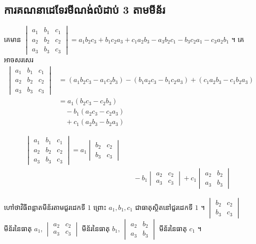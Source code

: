 \subsection{ការគណនាដេទែរមីណង់លំដាប់ 3 តាមមីន័រ}

គេមាន $\begin{vmatrix} a_1 & b_1 & c_1\\ a_2 & b_2 & c_2\\ a_3 & b_3 & c_3 \end{vmatrix} = a_1b_2c_3 + b_1c_2a_3 + c_1a_2b_3 - a_3b_2c_1 - b_3c_2a_1 - c_3a_2b_1$ ។ គេអាចសរសេរ
\[
\begin{aligned}
\begin{vmatrix} a_1 & b_1 & c_1\\
a_2 & b_2 & c_2\\
a_3 & b_3 & c_3 \end{vmatrix} &= (a_1b_2c_3 - a_1c_2b_3) - (b_1a_2c_3 - b_1c_2a_3) + (c_1a_2b_3 - c_1b_2a_3)\\
&= a_1(b_2c_3 - c_2b_3)\\
&\quad - b_1(a_2c_3 - c_2a_3)\\
&\quad + c_1(a_2b_3 - b_2a_3)
\end{aligned}
\]
\begin{formulaBox}[ដូច្នេះ]
\[
\begin{aligned}
\begin{vmatrix} a_1 & b_1 & c_1\\ a_2 & b_2 & c_2\\ a_3 & b_3 & c_3 \end{vmatrix} = a_1\begin{vmatrix} b_2 & c_2\\ b_3 & c_3 \end{vmatrix} &\\
&\quad - b_1\begin{vmatrix} a_2 & c_2\\ a_3 & c_3 \end{vmatrix} + c_1\begin{vmatrix} a_2 & b_2\\ a_3 & b_3 \end{vmatrix}
\end{aligned}
\]
\end{formulaBox}
ហៅថាវិធីពន្លាតមីន័រតាមជួរដេកទី $1$ ព្រោះ $a_1, b_1, c_1$ ជាធាតុស្ថិតនៅជួរដេកទី $1$ ។ $\begin{vmatrix} b_2 & c_2\\ b_3 & c_3 \end{vmatrix}$ មីន័រនៃធាតុ $a_1$, $\begin{vmatrix} a_2 & c_2\\ a_3 & c_3 \end{vmatrix}$ មីន័រនៃធាតុ $b_1$, $\begin{vmatrix} a_2 & b_2\\ a_3 & b_3 \end{vmatrix}$ មីន័រនៃធាតុ $c_1$ ។
